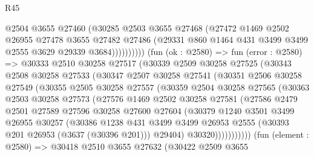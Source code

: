 \begin{lexlean}{R45}
\begin{coremodule}
                      @2504
                      @3655
                      @27460
                      (@30285
                        @2503
                        @3655
                        @27468
                        (@27472
                          @1469
                          @2502
                          @26955
                          @27478
                          @3655
                          @27482
                          @27486
                          (@29331 @860 @1464 @431 @3499 @3499 @2555 @3629 @29339 @3684))))))))))
        (fun (ok : @2580) =>
        fun (error : @2580) =>
        @30333
          @2510
          @30258
          @27517
          (@30339
            @2509
            @30258
            @27525
            (@30343
              @2508
              @30258
              @27533
              (@30347
                @2507
                @30258
                @27541
                (@30351
                  @2506
                  @30258
                  @27549
                  (@30355
                    @2505
                    @30258
                    @27557
                    (@30359
                      @2504
                      @30258
                      @27565
                      (@30363
                        @2503
                        @30258
                        @27573
                        (@27576
                          @1469
                          @2502
                          @30258
                          @27581
                          (@27586
                            @2479
                            @2501
                            @27589
                            @27596
                            @30258
                            @27600
                            @27604
                            (@30379
                              @1240
                              @3501
                              @3499
                              @26955
                              @30257
                              (@30386
                                @1238
                                @431
                                @3499
                                @3499
                                @26953
                                @2555
                                (@30393 @201 @26953 (@3637 (@30396 @201)))
                                @29404)
                              @30320)))))))))))
        (fun (element : @2580) =>
        @30418
          @2510
          @3655
          @27632
          (@30422
            @2509
            @3655

\end{coremodule}
\end{lexlean}
